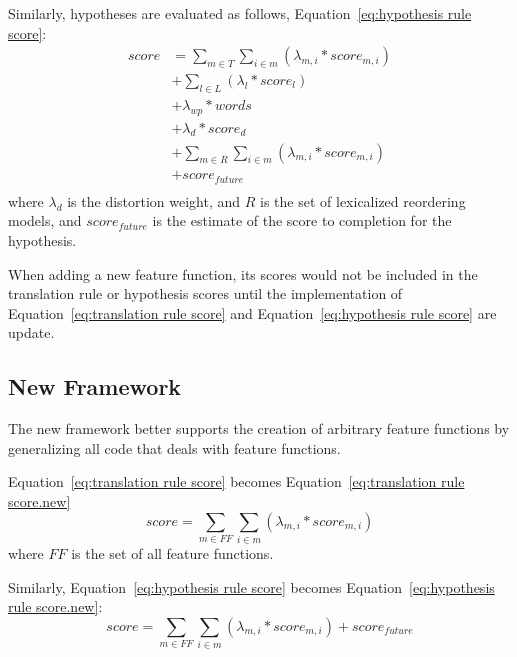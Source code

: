 \documentclass{pbml}
\begin{document}
Similarly, hypotheses are evaluated as follows, Equation~\ref{eq:hypothesis rule score}:
\begin{equation}
\begin{split}
 score & =  \sum_{m \in T} \sum_{i \in m} (\lambda_{m,i} * score_{m,i}) \\
    & + \sum_{l \in L} (\lambda_l * score_l) \\
    & + \lambda_{wp} * words \\
    & + \lambda_d * score_d \\
    & + \sum_{m \in R} \sum_{i \in m} (\lambda_{m,i} * score_{m,i})  \\
    & + score_{future} \\
\label{eq:hypothesis rule score}
\end{split}
\end{equation}
where $\lambda_d$ is the distortion weight, and $R$ is the set of lexicalized reordering models, and $score_{future}$ is the estimate of the score to completion for the hypothesis.

When adding a new feature function, its scores would not be included in the translation rule or hypothesis scores until the implementation of Equation~\ref{eq:translation rule score} and Equation~\ref{eq:hypothesis rule score} are update.



\subsection{New Framework}
The new framework better supports the creation of arbitrary feature functions by generalizing all code that deals with feature functions.

Equation~\ref{eq:translation rule score} becomes Equation~\ref{eq:translation rule score.new}
\begin{equation}
  score = \sum_{m \in FF} \sum_{i \in m} (\lambda_{m,i} * score_{m,i})
\label{eq:translation rule score.new}
\end{equation}
where $FF$ is the set of all feature functions.

Similarly, Equation~\ref{eq:hypothesis rule score} becomes Equation~\ref{eq:hypothesis rule score.new}:
\begin{equation}
  score =  \sum_{m \in FF} \sum_{i \in m} (\lambda_{m,i} * score_{m,i})
	  + score_{future}
\label{eq:hypothesis rule score.new}
\end{equation}
\end{document}
